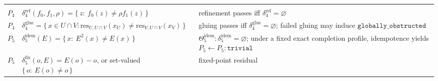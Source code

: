 \documentclass[11pt]{article}
\theoremstyle{definition}
\begin{document}
\begin{longtable}[]{@{}lll@{}}
\begin{minipage}[t]{0.30\columnwidth}
\end{minipage}\tabularnewline
\begin{minipage}[t]{0.30\columnwidth}\raggedright
\(P_4\)\strut
\end{minipage} & \begin{minipage}[t]{0.30\columnwidth}\raggedright
\(\delta_4^{\mathrm{ref}}(f_0,f_1,\rho)=\{\,z:\ f_0(z)\neq\rho f_1(z)\,\}\)\strut
\end{minipage} & \begin{minipage}[t]{0.30\columnwidth}\raggedright
refinement passes iff \(\delta_4^{\mathrm{ref}}=\varnothing\)\strut
\end{minipage}\tabularnewline
\begin{minipage}[t]{0.30\columnwidth}\raggedright
\(P_4\)\strut
\end{minipage} & \begin{minipage}[t]{0.30\columnwidth}\raggedright
\(\delta_4^{\mathrm{glue}}=\{\,x\in U\cap V:\mathrm{res}_{U,U\cap V}(x_U)\neq\mathrm{res}_{V,U\cap V}(x_V)\,\}\)\strut
\end{minipage} & \begin{minipage}[t]{0.30\columnwidth}\raggedright
gluing passes iff \(\delta_4^{\mathrm{glue}}=\varnothing\); failed gluing may induce \(\texttt{globally\_obstructed}\)\strut
\end{minipage}\tabularnewline
\begin{minipage}[t]{0.30\columnwidth}\raggedright
\(P_5\)\strut
\end{minipage} & \begin{minipage}[t]{0.30\columnwidth}\raggedright
\(\delta_5^{\mathrm{idem}}(E)=\{\,x:\ E^2(x)\neq E(x)\,\}\)\strut
\end{minipage} & \begin{minipage}[t]{0.30\columnwidth}\raggedright
\(\Theta_5^{\mathrm{idem}}:\delta_5^{\mathrm{idem}}=\varnothing\); under a fixed exact completion profile, idempotence yields \(P_5\leftarrow P_5:\texttt{trivial}\)\strut
\end{minipage}\tabularnewline
\begin{minipage}[t]{0.30\columnwidth}\raggedright
\(P_5\)\strut
\end{minipage} & \begin{minipage}[t]{0.30\columnwidth}\raggedright
\(\delta_5^{\mathrm{fix}}(o,E)=E(o)-o\), or set-valued \(\{\,o:\ E(o)\neq o\,\}\)\strut
\end{minipage} & \begin{minipage}[t]{0.30\columnwidth}\raggedright
fixed-point residual\strut

\end{minipage}
\end{longtable}
\end{document}
